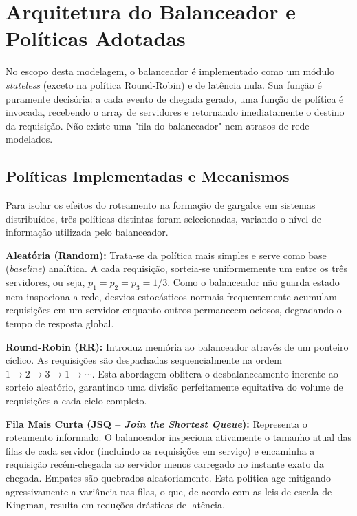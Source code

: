 \documentclass[conference]{IEEEtran}
\begin{document}
\section{Arquitetura do Balanceador e Políticas Adotadas}

No escopo desta modelagem, o balanceador é implementado como um módulo \textit{stateless} (exceto na política Round-Robin) e de latência nula. Sua função é puramente decisória: a cada evento de chegada gerado, uma função de política é invocada, recebendo o array de servidores e retornando imediatamente o destino da requisição. Não existe uma "fila do balanceador" nem atrasos de rede modelados.

\subsection{Políticas Implementadas e Mecanismos}

Para isolar os efeitos do roteamento na formação de gargalos em sistemas distribuídos, três políticas distintas foram selecionadas, variando o nível de informação utilizada pelo balanceador.

\textbf{Aleatória (Random):} Trata-se da política mais simples e serve como base (\textit{baseline}) analítica. A cada requisição, sorteia-se uniformemente um entre os três servidores, ou seja, $p_1 = p_2 = p_3 = 1/3$. Como o balanceador não guarda estado nem inspeciona a rede, desvios estocásticos normais frequentemente acumulam requisições em um servidor enquanto outros permanecem ociosos, degradando o tempo de resposta global.

\textbf{Round-Robin (RR):} Introduz memória ao balanceador através de um ponteiro cíclico. As requisições são despachadas sequencialmente na ordem $1 \to 2 \to 3 \to 1 \to \cdots$. Esta abordagem oblitera o desbalanceamento inerente ao sorteio aleatório, garantindo uma divisão perfeitamente equitativa do volume de requisições a cada ciclo completo.

\textbf{Fila Mais Curta (JSQ -- \textit{Join the Shortest Queue}):} Representa o roteamento informado. O balanceador inspeciona ativamente o tamanho atual das filas de cada servidor (incluindo as requisições em serviço) e encaminha a requisição recém-chegada ao servidor menos carregado no instante exato da chegada. Empates são quebrados aleatoriamente. Esta política age mitigando agressivamente a variância nas filas, o que, de acordo com as leis de escala de Kingman, resulta em reduções drásticas de latência.
\end{document}
